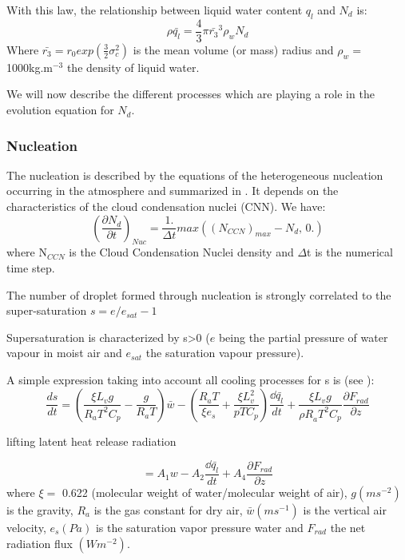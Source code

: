 With this law, the relationship between liquid water content $q_{l}$ and
$N_{d}$ is:
\begin{equation}
\rho \bar{q_{l}}=\frac{4}{3}\pi \bar{r_{3}}^{3}\rho_{w}N_{d}
\end{equation}
Where $\bar{r_{3}}=r_{0}exp\left( \frac{3}{2}\sigma_{c}^{2}
\right)$ is the mean volume (or mass) radius and $\rho
_{w}=$1000kg.m$^{-3}$ the density of liquid water.

We will now describe the different processes which are playing a role in the
evolution equation for $N_{d}$.

\subsubsection{Nucleation}
The nucleation is described by the equations of the heterogeneous nucleation
occurring in the atmosphere and summarized in
\cite{Pruppacher:2000}. It depends on the characteristics of the cloud condensation nuclei
(CNN). We have:
\begin{equation}
\left( \frac{\partial N_{d}}{\partial t} \right)_{Nuc}=\frac{1.}{\Delta
t}max\left( \left( N_{CCN} \right)_{max}-N_{d},\, 0. \right)
\end{equation}
where N$_{CCN}$ is the Cloud Condensation Nuclei density and $\Delta $t is
the numerical time step.

The number of droplet formed through nucleation is strongly correlated to
the super-saturation
\newline
$s = e/e_{sat} -1$

 Supersaturation is characterized by s\textgreater 0
($e$ being the partial pressure of water vapour in moist
air and $e_{sat}$ the saturation vapour pressure).

A simple expression taking into account all cooling processes for s is (see
\cite{Zhang:2014}):
\begin{equation}
\frac{ds}{dt}=\left( \frac{\xi L_{v}g}{R_{a}T^{2}C_{p}}-\frac{g}{R_{a}T}
\right)\bar{w}-\left( \frac{R_{a}T}{\xi e_{s}}+\frac{\xi L_{v}^{2}}{pTC_{p}}
\right)\frac{\dd\bar{q_{l}}}{dt}+\frac{\xi L_{v}g}{{\rho
R}_{a}T^{2}C_{p}}\frac{\partial F_{rad}}{\partial z}
\end{equation}
\begin{center}
lifting \quad	\quad \quad \quad \quad \quad \quad \quad \quad latent	\quad heat \quad	release \quad	radiation
\end{center}
\begin{equation}
=A_{1}w-A_{2}\frac{\dd\bar{q_{l}}}{dt}+A_{4}\frac{\partial F_{rad}}{\partial
z}
\end{equation}
where $\xi =$ 0.622 (molecular weight of water/molecular
weight of air), $g (\si{m s^{-2}})$ is the gravity, $R_{a}$ is the gas constant for
dry air, $\bar{w} (\si{m s^{-1}})$ is the vertical air velocity, $e_{s} (\si{Pa})$ is
the saturation vapor pressure water and $F_{rad}$ the net radiation flux $(\si{W
m^{-2}})$.

